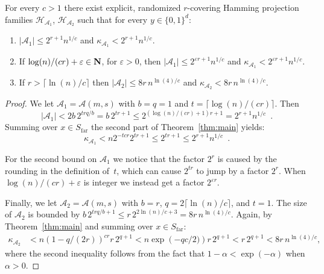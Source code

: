 \documentclass[prodmode,acmtalg]{acmsmall}
\newcommand{\ceil}[1]{\lceil{#1}\rceil}
\begin{document}
\begin{corollary}\label{cor:params}
	For every $c>1$ there exist explicit, randomized $r$-covering Hamming projection families $\mathcal{H}_{\mathcal{A}_1}$, $\mathcal{H}_{\mathcal{A}_2}$
	such that for every $y\in \{0,1\}^d$:
	\begin{enumerate}
		\item $|\mathcal{A}_1| \leq 2^{r+1} n^{1/c}$ and 
		$\kappa_{\mathcal{A}_1} < 2^{r+1} n^{1/c}$.
		\item If $\log(n)/(cr) + \varepsilon \in {\bf N}$, for $\varepsilon > 0$, then $|\mathcal{A}_1| \leq 2^{\varepsilon r+1} n^{1/c}$ and $\kappa_{\mathcal{A}_1} < 2^{\varepsilon r+1} n^{1/c}$.
		\item If $r>\ceil{\ln(n)/c}$ then $|\mathcal{A}_2| \leq 8r\, n^{\ln(4)/c}$ and 
		$\kappa_{\mathcal{A}_2} < 8r\, n^{\ln(4)/c}$.
	\end{enumerate}
\end{corollary}
\begin{proof}
		We let $\mathcal{A}_1 = \mathcal{A}(m,s)$ with $b=q=1$ and $t = \ceil{\log(n)/(cr)}$. Then 
$$|\mathcal{A}_1| < 2b\, 2^{trq/b} = b\, 2^{tr+1} \leq 2^{(\log(n)/(cr)+1)r+1} = 2^{r+1} n^{1/c} \enspace .$$
Summing over $x\in S_\text{far}$ the second part of Theorem~\ref{thm:main} yields: 
$$\kappa_{\mathcal{A}_1} < n 2^{-tcr} 2^{tr+1} \leq 2^{tr+1} \leq 2^{r+1} n^{1/c} \enspace .$$

\medskip
		
		For the second bound on $\mathcal{A}_1$ we notice that the factor $2^r$ is caused by the rounding in the definition of~$t$, which can cause $2^{tr}$ to jump by a factor $2^r$. When $\log(n)/(cr) + \varepsilon$ is integer we instead get a factor $2^{\varepsilon r}$.
		
\medskip
		
		Finally, we let $\mathcal{A}_2 = \mathcal{A}(m,s)$ with $b=r$, $q=2\ceil{\ln(n)/c}$, and $t = 1$. The size of $\mathcal{A}_2$ is bounded by 
$b\, 2^{trq/b+1} \leq r\, 2^{2\ln(n)/c + 3} = 8r\, n^{\ln(4)/c}$.
Again, by Theorem~\ref{thm:main} and summing over $x\in S_\text{far}$:
\begin{align*}
			\kappa_{\mathcal{A}_2} & < n \left(1 - q/(2r) \right)^{cr} r\, 2^{q+1}
			 < n \exp\left(- qc/2) \right) r\, 2^{q+1}
			 < r\, 2^{q+1}
			 < 8r\, n^{\ln(4)/c},
		\end{align*}
where the second inequality follows from the fact that $1-\alpha < \exp(-\alpha)$ when $\alpha > 0$. 
\end{proof}
\end{document}
